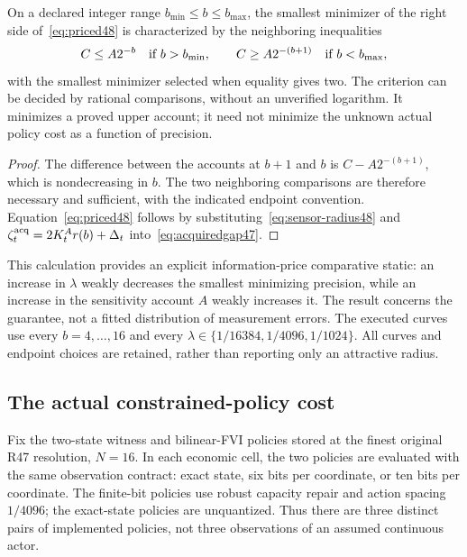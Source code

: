 \begin{proposition}\label{prop:sensor48}
On a declared integer range $b_{\min}\le b\le b_{\max}$, the smallest minimizer of the right side of~\eqref{eq:priced48} is characterized by the neighboring inequalities
\begin{equation}\label{eq:bits-opt48}
 C\le A2^{-b}\quad\hbox{if }b>b_{\min},\qquad
 C\ge A2^{-(b+1)}\quad\hbox{if }b<b_{\max},
\end{equation}
with the smallest minimizer selected when equality gives two. The criterion can be decided by rational comparisons, without an unverified logarithm. It minimizes a proved upper account; it need not minimize the unknown actual policy cost as a function of precision.
\end{proposition}
\begin{proof}
The difference between the accounts at $b+1$ and $b$ is $C-A2^{-(b+1)}$, which is nondecreasing in $b$. The two neighboring comparisons are therefore necessary and sufficient, with the indicated endpoint convention. Equation~\eqref{eq:priced48} follows by substituting~\eqref{eq:sensor-radius48} and $\zeta_t^{\rm acq}=2K_t^Ar(b)+\Delta_t$ into~\eqref{eq:acquiredgap47}.
\end{proof}

This calculation provides an explicit information-price comparative static: an increase in $\lambda$ weakly decreases the smallest minimizing precision, while an increase in the sensitivity account $A$ weakly increases it. The result concerns the guarantee, not a fitted distribution of measurement errors. The executed curves use every $b=4,\ldots,16$ and every $\lambda\in\{1/16384,1/4096,1/1024\}$. All curves and endpoint choices are retained, rather than reporting only an attractive radius.

\subsection{The actual constrained-policy cost}
Fix the two-state witness and bilinear-FVI policies stored at the finest original R47 resolution, $N=16$. In each economic cell, the two policies are evaluated with the same observation contract: exact state, six bits per coordinate, or ten bits per coordinate. The finite-bit policies use robust capacity repair and action spacing $1/4096$; the exact-state policies are unquantized. Thus there are three distinct pairs of implemented policies, not three observations of an assumed continuous actor.

